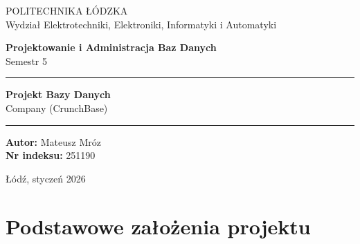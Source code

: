 \documentclass[12pt,a4paper]{article}
\begin{document}
\begin{titlepage}
    \centering
    \vspace*{1.5cm}

    {\Large\textsc{POLITECHNIKA ŁÓDZKA}\\[0.4cm]
    \large Wydział Elektrotechniki, Elektroniki, Informatyki i Automatyki}

    \vspace{2.5cm}

    {\large\textbf{Projektowanie i Administracja Baz Danych}\\[0.2cm]
    Semestr 5}

    \vspace{2.5cm}

    \rule{0.8\textwidth}{0.5pt}
    \vspace{0.5cm}

    {\Huge\bfseries Projekt Bazy Danych\\[0.4cm]}
    {\LARGE Company (CrunchBase)}

    \vspace{0.5cm}
    \rule{0.8\textwidth}{0.5pt}

    \vspace{3.5cm}

    \begin{center}
        \large
        \textbf{Autor:} Mateusz Mróz\\
        \textbf{Nr indeksu:} 251190
    \end{center}

    \vfill

    {\large Łódź, styczeń 2026}

\end{titlepage}

\tableofcontents
\newpage

\section{Podstawowe założenia projektu}
\end{document}

